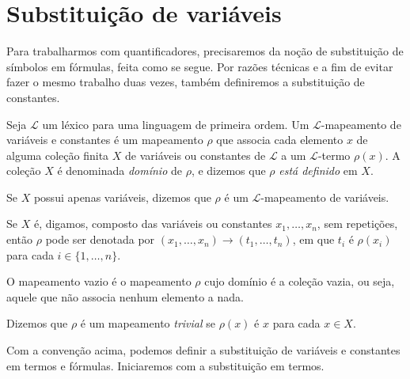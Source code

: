 \section{Substituição de variáveis}
\label{sec:substituicao}
Para trabalharmos com quantificadores, precisaremos da noção de substituição de símbolos em fórmulas, feita como se segue.
Por razões técnicas e a fim de evitar fazer o mesmo trabalho duas vezes, também definiremos a substituição de constantes.

\begin{convention}\label{conv:mapaDeSubstituicao}
    Seja $\mathcal L$ um léxico para uma linguagem de primeira ordem.
    Um $\mathcal L$-mapeamento de variáveis e constantes é um mapeamento $\rho$ que associa cada elemento $x$ de alguma coleção finita $X$ de variáveis ou constantes de $\mathcal L$ a um $\mathcal L$-termo $\rho(x)$.
    A coleção $X$ é denominada \emph{domínio} de $\rho$, e dizemos que $\rho$ \emph{está definido} em $X$.

    Se $X$ possui apenas variáveis, dizemos que $\rho$ é um $\mathcal L$-mapeamento de variáveis.

    Se $X$ é, digamos, composto das variáveis ou constantes $x_1, \dots, x_n$, sem repetições, então $\rho$ pode ser denotada por $(x_1, \dots, x_n)\to (t_1, \dots, t_n)$, em que $t_i$ é $\rho(x_i)$ para cada $i\in\{1,\dots,n\}$.

    O mapeamento vazio é o mapeamento $\rho$ cujo domínio é a coleção vazia, ou seja, aquele que não associa nenhum elemento a nada.


    Dizemos que $\rho$ é um mapeamento \emph{trivial} se $\rho(x)$ é $x$ para cada $x \in X$.
\end{convention}

Com a convenção acima, podemos definir a substituição de variáveis e constantes em termos e fórmulas.
Iniciaremos com a substituição em termos.

